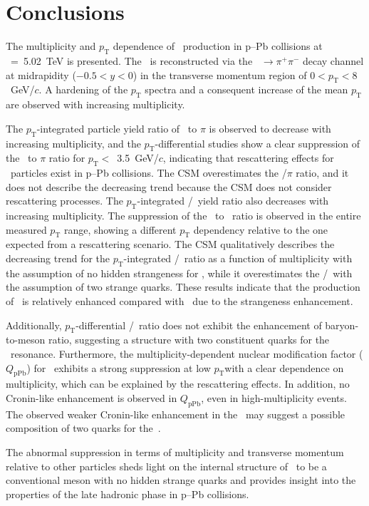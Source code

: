 
\section{Conclusions}
\label{sec:summary}

The multiplicity and $p_{\mathrm{T}}$ dependence of \fzero~production in p--Pb collisions at \snn~=~5.02~TeV is presented. The \fzero~is reconstructed via the \fzero~$\rightarrow\pi^{+}\pi^{-}$ decay channel at midrapidity ($-0.5<y<0$) in the transverse momentum region of $0<p_{\mathrm{T}}<8$~GeV/$c$. A hardening of the $p_{\mathrm{T}}$ spectra and a consequent increase of the mean $p_{\mathrm{T}}$ are observed with increasing multiplicity. 

The $p_{\mathrm{T}}$-integrated particle yield ratio of \fzero~to $\pi$ is observed to decrease with increasing multiplicity, and the $p_{\mathrm{T}}$-differential studies show a clear suppression of the \fzero~to $\pi$ ratio for $p_{\mathrm{T}}<$~3.5~GeV/$c$, indicating that rescattering effects for \fzero~particles exist in p--Pb collisions. The CSM overestimates the \fzero/$\pi$ ratio, and it does not describe the decreasing trend because the CSM does not consider rescattering processes. The $p_{\mathrm{T}}$-integrated \fzero/\kstar~yield ratio also decreases with increasing multiplicity. The suppression of the \fzero~to \kstar~ratio is observed in the entire measured $p_{\mathrm{T}}$ range, showing a different $p_{\mathrm{T}}$ dependency relative to the one expected from a rescattering scenario. The CSM qualitatively describes the decreasing trend for the $p_{\mathrm{T}}$-integrated \fzero/\kstar~ratio as a function of multiplicity with the assumption of no hidden strangeness for \fzero, while it overestimates the \fzero/\kstar~with the assumption of two strange quarks. These results indicate that the production of \kstar~is relatively enhanced compared with \fzero~due to the strangeness enhancement. 

Additionally, $p_{\mathrm{T}}$-differential \fzero/\kstar~ratio does not exhibit the enhancement of baryon-to-meson ratio, suggesting a structure with two constituent quarks for the \fzero~resonance. Furthermore, the multiplicity-dependent nuclear modification factor ($Q_{\mbox{pPb}}$) for \fzero~exhibits a strong suppression at low $p_{\mathrm{T}}$with a clear
dependence on multiplicity, which can be explained by the rescattering effects. In addition, no Cronin-like enhancement is observed in $Q_{\mbox{pPb}}$, even in high-multiplicity events. The observed weaker Cronin-like enhancement in the \fzero~may suggest a possible composition of two quarks for the~\fzero. 

The abnormal suppression in terms of multiplicity and transverse momentum relative to other particles sheds light on the internal structure of \fzero~to be a conventional meson with no hidden strange quarks and provides insight into the properties of the late hadronic phase in p--Pb collisions.
